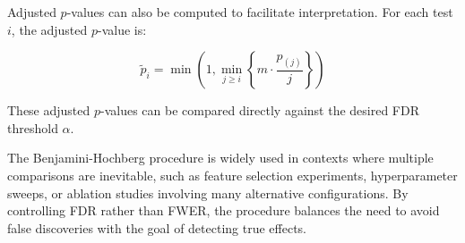Adjusted $p$-values can also be computed to facilitate interpretation. For each test $i$, the adjusted $p$-value is:

\begin{equation}
\tilde{p}_i = \min\left(1, \min_{j \geq i} \left\{ m \cdot \frac{p_{(j)}}{j} \right\} \right)
\end{equation}

These adjusted $p$-values can be compared directly against the desired FDR threshold $\alpha$.

The Benjamini-Hochberg procedure is widely used in contexts where multiple comparisons are inevitable, such as feature selection experiments, hyperparameter sweeps, or ablation studies involving many alternative configurations. By controlling FDR rather than FWER, the procedure balances the need to avoid false discoveries with the goal of detecting true effects.